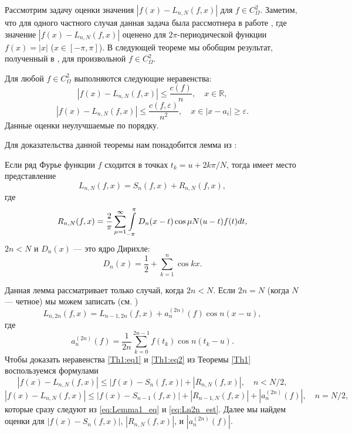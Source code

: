 Рассмотрим задачу оценки значения $\left|f(x)-L_{n,N}(f,x)\right|$ для $f\in C_{\Omega}^{2}$.
Заметим, что для одного частного случая данная задача была рассмотнера в работе \cite{akniyev}, где значение $\left|f(x)-L_{n,N}(f,x)\right|$ 
оценено для $2\pi$-периодической функции $f(x) = |x|$ ($x \in [-\pi,\pi]$).
В следующей теореме мы обобщим результат, полученный в \cite{akniyev}, для произвольной  $f \in C_{\Omega}^{2}$.
\begin{theorem}
	\label{Th1} Для любой $f\in C_{\Omega}^{2}$ выполняются следующие неравенства:
	\begin{equation}\label{Th1:eq1}
	\left|f(x)-L_{n,N}(f,x)\right|\leq\frac{c(f)}{n},\quad x\in\mathbb{R},
	\end{equation}
	\begin{equation}\label{Th1:eq2}
	\left|f(x)-L_{n,N}(f,x)\right|\leq\frac{c(f,\varepsilon)}{n^{2}},\quad x\in\left|x-a_{i}\right|\geq\varepsilon.
	\end{equation}
	Данные оценки неулучшаемые по порядку.
\end{theorem}
Для доказательства данной теоремы нам понадобится лемма из \cite{shii-1983}:
\begin{lemma}
	Если ряд Фурье функции $f$ сходится в точках $t_{k}=u+2k\pi/N$,
	тогда имеет место представление 
	\begin{equation}
	L_{n,N}(f,x)=S_{n}(f,x)+R_{n,N}(f,x),\label{eq:Lemma1_eq}
	\end{equation}
	где
	\begin{equation}
	R_{n,N}(f,x)=\frac{2}{\pi}\sum_{\mu=1}^{\infty}\intop_{-\pi}^{\pi}D_{n}(x-t)\cos\mu N(u-t)f(t)dt,\label{eq:RnN1}
	\end{equation}
	$2n<N$ и $D_{n}(x)$ --- это ядро Дирихле:
	\begin{equation}\label{eq:D(x)}
		D_{n}(x)=\frac{1}{2}+\sum_{k=1}^{n}\cos kx.
	\end{equation}
\end{lemma}
Данная лемма рассматривает только случай, когда $2n < N$. Если $2n=N$ (когда $N$ --- четное) мы можем записать (см. \cite{shii-1983})
\begin{equation}
	L_{n,2n}(f,x)=L_{n-1,2n}(f,x)+a_{n}^{(2n)}(f)\cos n(x-u),\label{eq:Ln2n_est}
\end{equation}
где
\begin{equation}
a_{n}^{(2n)}(f)=\frac{1}{2n}\sum_{k=0}^{2n-1}f(t_{k})\cos n(t_{k}-u).\label{eq:a_n_formula}
\end{equation}
Чтобы доказать неравенства \eqref{Th1:eq1} и \eqref{Th1:eq2} из Теоремы \ref{Th1} воспользуемся формулами
\begin{equation}
	\left|f(x)-L_{n,N}(f,x)\right|\leq\left|f(x)-S_{n}(f,x)\right|+\left|R_{n,N}(f,x)\right|,\quad n<N/2,\label{eq:Th_est1}
\end{equation}
\begin{equation}
	\left|f(x)-L_{n,N}(f,x)\right|\leq
	\left|f(x)-S_{n-1}(f,x)\right|+\left|R_{n-1,N}(f,x)\right|+\left|a_{n}^{(2n)}(f)\right|,\quad n=N/2\label{eq:Th_est_2},
\end{equation}
которые сразу следуют из \eqref{eq:Lemma1_eq} и \eqref{eq:Ln2n_est}.
Далее мы найдем оценки для $\left|f(x)-S_{n}(f,x)\right|$, $\left|R_{n,N}(f,x)\right|$, и $|a_{n}^{(2n)}(f)|$.

